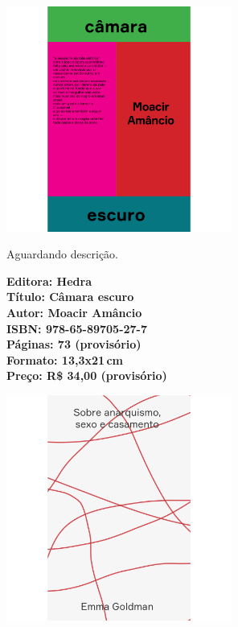 \begin{center}
\hspace*{-3.6cm}
\hspace*{3.1cm}\includegraphics[width=74mm]{./CAPAS/HEDRA_CAMARA.jpg}
\end{center}
\hspace*{-7cm}\hrulefill\hspace*{-7cm}
\medskip

\noindent{}Aguardando descrição.

\vfill
\noindent\begin{minipage}[c]{1\linewidth}
{\small\textbf{
\hspace*{-.1cm}Editora: Hedra\\
Título: Câmara escuro\\
Autor: Moacir Amâncio\\ 
ISBN: 978-65-89705-27-7\\
Páginas: 73 (provisório)\\
Formato: 13,3x21\,cm\\
Preço: R\$ 34,00 (provisório)\\
}}
\end{minipage}
\pagebreak

\begin{center}
\hspace*{.5cm}\includegraphics[width=74mm]{./CAPAS/HEDRA_GOLDMAN.jpg}
\end{center}
\hspace*{-7cm}\hrulefill\hspace*{-7cm}
\medskip

